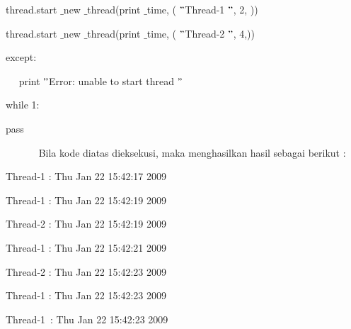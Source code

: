 \documentclass[a4paper,12pt]{report}
\begin{document}
\noindent 
{\fontsize{10pt}{10pt}\selectfont  thread.start $  \_  $new $  \_  $thread(print $  \_  $time, ( $ " $Thread-1 $ " $, 2, ))} \par
\noindent 
{\fontsize{10pt}{10pt}\selectfont  thread.start $  \_  $new $  \_  $thread(print $  \_  $time, ( $ " $Thread-2 $ " $, 4,))} \par
\noindent 
{\fontsize{10pt}{10pt}\selectfont except:} \par
\noindent 
{\fontsize{10pt}{10pt}\selectfont ~~ print  $ " $Error: unable to start thread $ " $} \par
\vspace{10pt}
\noindent 
{\fontsize{10pt}{10pt}\selectfont while 1:} \par
\noindent 
{\fontsize{10pt}{10pt}\selectfont pass} \par
\noindent 
~~~~~~ Bila kode diatas dieksekusi, maka menghasilkan hasil sebagai berikut : \par
\noindent 
\begin{center}{\fontsize{10pt}{10pt}\selectfont Thread-1 : Thu Jan 22 15:42:17 2009}\end{center} \par
\noindent 
\begin{center}{\fontsize{10pt}{10pt}\selectfont Thread-1 : Thu Jan 22 15:42:19 2009}\end{center} \par
\noindent 
\begin{center}{\fontsize{10pt}{10pt}\selectfont Thread-2 : Thu Jan 22 15:42:19 2009}\end{center} \par
\noindent 
\begin{center}{\fontsize{10pt}{10pt}\selectfont Thread-1 : Thu Jan 22 15:42:21 2009}\end{center} \par
\noindent 
\begin{center}{\fontsize{10pt}{10pt}\selectfont Thread-2 : Thu Jan 22 15:42:23 2009}\end{center} \par
\noindent 
\begin{center}{\fontsize{10pt}{10pt}\selectfont Thread-1 : Thu Jan 22 15:42:23 2009}\end{center} \par
\noindent 
\begin{center}{\fontsize{10pt}{10pt}\selectfont Thread-1~:  Thu Jan 22 15:42:23 2009}\end{center} \par
\end{document}
